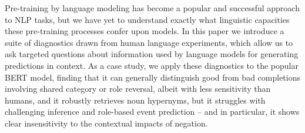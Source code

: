 Pre-training by language modeling has become a popular and successful approach to NLP tasks, but we have yet to understand exactly what linguistic capacities these pre-training processes confer upon models. In this paper we introduce a suite of diagnostics drawn from human language experiments, which allow us to ask targeted questions about information used by language models for generating predictions in context. As a case study, we apply these diagnostics to the popular BERT model, finding that it can generally distinguish good from bad completions involving shared category or role reversal, albeit with less sensitivity than humans, and it robustly retrieves noun hypernyms, but it struggles with challenging inference and role-based event prediction -- and in particular, it shows clear insensitivity to the contextual impacts of negation.